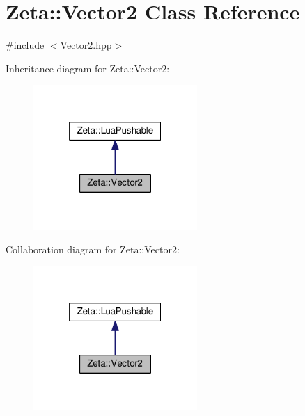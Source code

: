 \hypertarget{classZeta_1_1Vector2}{\section{Zeta\+:\+:Vector2 Class Reference}
\label{classZeta_1_1Vector2}
}


{\ttfamily \#include $<$Vector2.\+hpp$>$}



Inheritance diagram for Zeta\+:\+:Vector2\+:\nopagebreak
\begin{figure}[H]
\begin{center}
\leavevmode
\includegraphics[width=176pt]{classZeta_1_1Vector2__inherit__graph}
\end{center}
\end{figure}


Collaboration diagram for Zeta\+:\+:Vector2\+:\nopagebreak
\begin{figure}[H]
\begin{center}
\leavevmode
\includegraphics[width=176pt]{classZeta_1_1Vector2__coll__graph}
\end{center}
\end{figure}
